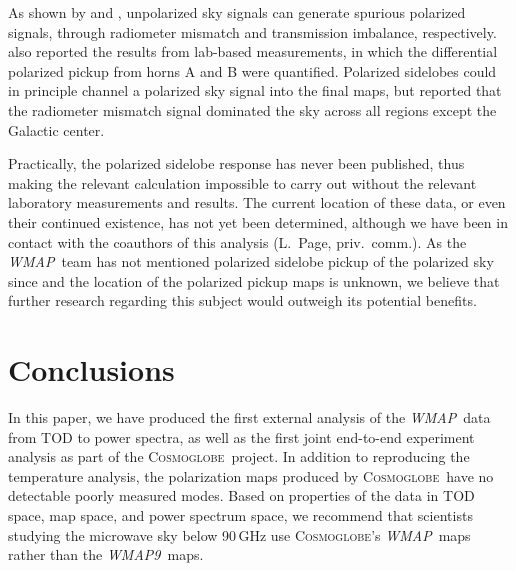 \documentclass[twocolumn]{../../common/aa}
\def\WMAP{\emph{WMAP}}
\def\WMAPnine{\emph{WMAP9}}
\newcommand{\cosmoglobe}{\textsc{Cosmoglobe}}
\begin{document}
As shown by \citet{barnes2003} and \citet{bp17},  unpolarized sky signals can generate spurious polarized signals, through radiometer mismatch and transmission imbalance, respectively. \citet{barnes2003} also reported the results from lab-based measurements, in which the differential polarized pickup from horns A and B were quantified. Polarized sidelobes could in principle channel a polarized sky signal into the final maps, but \citet{barnes2003} reported that the radiometer mismatch signal dominated the sky across all regions except the Galactic center.

Practically, the polarized sidelobe response has never been published, thus making the relevant calculation impossible to carry out without the relevant laboratory measurements and results. The current location of these data, or even their continued existence, has not yet been determined, although we have been in contact with the coauthors of this analysis (L.~Page, priv.~comm.).
As the \WMAP\ team has not mentioned polarized sidelobe pickup of the polarized sky since \citet{barnes2003} and the location of the polarized pickup maps is unknown, we believe that further research regarding this subject would outweigh its potential benefits.


\section{Conclusions}
\label{sec:conclusions}

In this paper, we have produced the first external analysis of the \WMAP\ data from TOD to power spectra, as well as the first joint end-to-end experiment analysis as part of the \cosmoglobe\ project. In addition to reproducing the temperature analysis, the polarization maps produced by \cosmoglobe\ have no detectable poorly measured modes. Based on properties of the data in TOD space, map space, and power spectrum space, we recommend that scientists studying the microwave sky below 90\,GHz use \cosmoglobe's \WMAP\ maps rather than the \WMAPnine\ maps.
\end{document}
